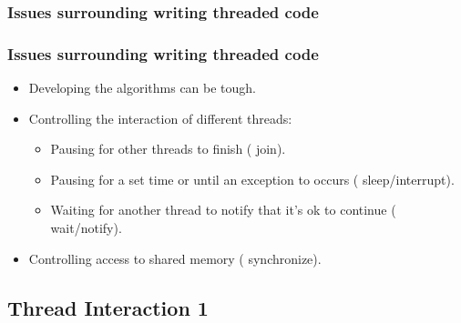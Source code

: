 \documentclass{beamer}
\begin{document}

\subsubsection{Issues surrounding writing threaded code}
\begin{frame}
\frametitle{Issues surrounding writing threaded code}

\begin{itemize}
\item Developing the algorithms can be tough.
\item Controlling the interaction of different threads:
\begin{itemize}
\item Pausing for other threads to finish ({\color{purple} join}).
\item Pausing for a set time or until an exception to occurs ({\color{orange} sleep/interrupt}).
\item Waiting for another thread to notify that it's ok to continue ({\color{magenta} wait/notify}).
\end{itemize}
\item Controlling access to shared memory ({\color{brown} synchronize}).

\end{itemize}
\end{frame}
\subsection{Thread Interaction 1}
\end{document}
